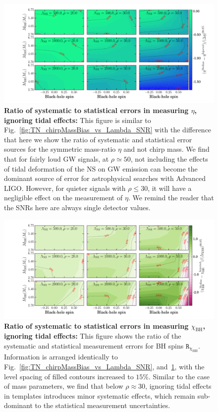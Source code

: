 \documentclass[aps,prd,amsmath,floats,floatfix, twocolumn,
superscriptaddress,nofootinbib,showpacs]{revtex4-1}
\newcommand{\chibh}{\chi_\mathrm{BH}}
\newcommand{\arr}{\mathtt{R}}
\begin{document}
\begin{figure}[!t]
\centering
\includegraphics[trim=20 20 18 21 0,clip=true,width=1.95\columnwidth]{TNEtaBiasesOverCIWidths_CI90_0_Lambda_SNR20_50_linear}
\caption{{\bf Ratio of systematic to statistical errors in measuring $\eta$, ignoring tidal effects:}
This figure is similar to Fig.~\ref{fig:TN_chirpMassBias_vs_Lambda_SNR}
with the difference that here we show the ratio of systematic and statistical
error sources for the symmetric mass-ratio $\eta$ and not chirp mass. We find
that for fairly loud GW signals, at $\rho\simeq 50$, not including the
effects of tidal deformation of the NS on GW emission can become the dominant
source of error for astrophysical searches with Advanced LIGO. However, for
quieter signals with $\rho\leq 30$, it will have a negligible effect on the
measurement of $\eta$. We remind the reader that the SNRs here are always
single detector values.
}
\label{fig:TN_EtaBias_vs_Lambda_SNR}
\end{figure}
% 
% 
\begin{figure}
\centering
\includegraphics[trim=20 20 18 20 0,clip=true,width=1.95\columnwidth]{TNChiBHBiasesOverCIWidths_CI90_0_Lambda_SNR_linear}
\caption{{\bf Ratio of systematic to statistical errors in measuring $\chibh$, ignoring tidal effects:}
This figure shows the ratio of the systematic and statistical
measurement errors for BH spins $\arr_{\chibh}$. Information is arranged identically
to Fig.~\ref{fig:TN_chirpMassBias_vs_Lambda_SNR}, 
and~\ref{fig:TN_EtaBias_vs_Lambda_SNR}, with the level spacing of filled contours
increased to $15\%$.
Similar to the case of mass parameters, we find that below $\rho\approx 30$,
ignoring tidal effects in templates introduces minor systematic effects,
which remain sub-dominant to the statistical measurement uncertainties.
}
\label{fig:TN_BHspinBias_vs_Lambda_SNR}
\end{figure}
\end{document}
